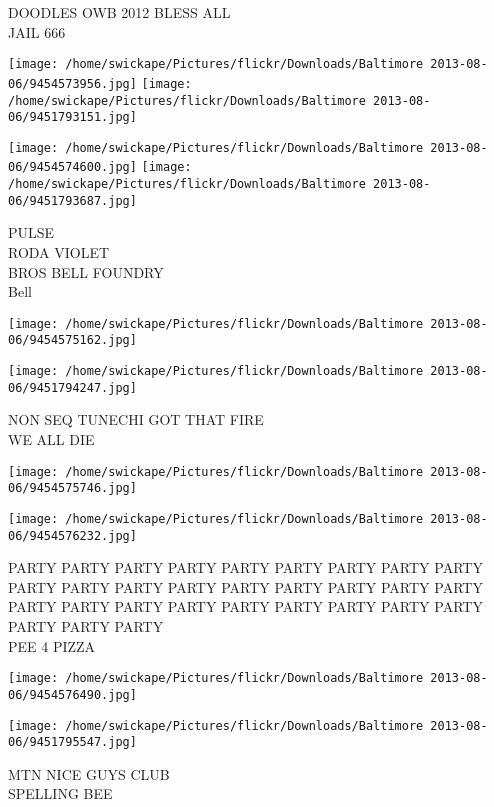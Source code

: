 \documentclass[10pt,letterpaper]{article}
\begin{document}
DOODLES OWB 2012 BLESS ALL\\
JAIL 666\\
\pagebreak

\texttt{[image: /home/swickape/Pictures/flickr/Downloads/Baltimore 2013-08-06/9454573956.jpg]}
\texttt{[image: /home/swickape/Pictures/flickr/Downloads/Baltimore 2013-08-06/9451793151.jpg]}

\texttt{[image: /home/swickape/Pictures/flickr/Downloads/Baltimore 2013-08-06/9454574600.jpg]}
\texttt{[image: /home/swickape/Pictures/flickr/Downloads/Baltimore 2013-08-06/9451793687.jpg]}

PULSE\\
RODA VIOLET\\
BROS BELL FOUNDRY\\
Bell\\
\pagebreak

\texttt{[image: /home/swickape/Pictures/flickr/Downloads/Baltimore 2013-08-06/9454575162.jpg]}

\vspace{0.25in}
\texttt{[image: /home/swickape/Pictures/flickr/Downloads/Baltimore 2013-08-06/9451794247.jpg]}

NON SEQ TUNECHI GOT THAT FIRE\\
WE ALL DIE\\
\pagebreak

\texttt{[image: /home/swickape/Pictures/flickr/Downloads/Baltimore 2013-08-06/9454575746.jpg]}

\vspace{0.25in}
\texttt{[image: /home/swickape/Pictures/flickr/Downloads/Baltimore 2013-08-06/9454576232.jpg]}

PARTY PARTY PARTY PARTY PARTY PARTY PARTY PARTY PARTY PARTY PARTY PARTY PARTY PARTY PARTY PARTY PARTY PARTY PARTY PARTY PARTY PARTY PARTY PARTY PARTY PARTY PARTY PARTY PARTY PARTY\\
PEE 4 PIZZA\\
\pagebreak

\texttt{[image: /home/swickape/Pictures/flickr/Downloads/Baltimore 2013-08-06/9454576490.jpg]}

\vspace{0.25in}
\texttt{[image: /home/swickape/Pictures/flickr/Downloads/Baltimore 2013-08-06/9451795547.jpg]}

MTN NICE GUYS CLUB\\
SPELLING BEE\\
\pagebreak
\end{document}
